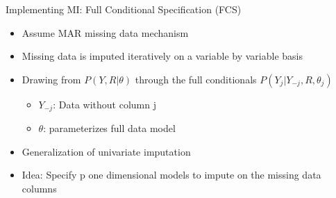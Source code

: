 \begin{frame}{Implementing MI: Full Conditional Specification (FCS)}
 \begin{itemize}
  \item Assume MAR missing data mechanism %
  \item Missing data is imputed iteratively on a variable by variable basis
\item Drawing from $P(Y,R|\theta)$ through the full conditionals $P(Y_j|Y_{-j},R,\theta_j)$
  \begin{itemize}
   \item $Y_{-j}$: Data without column j
   \item $\theta$: parameterizes full data model
  \end{itemize}

  \item Generalization of univariate imputation
  \item Idea: Specify p one dimensional models to impute on the missing data columns
 \end{itemize}

\end{frame}

